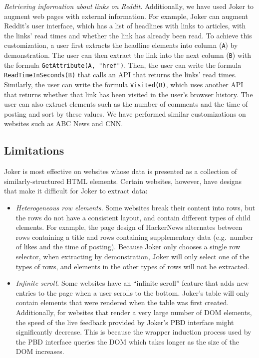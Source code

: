 \documentclass[sigconf,10pt]{acmart}
\providecommand{\tightlist}{%
  \setlength{\itemsep}{0pt}\setlength{\parskip}{0pt}}
\begin{document}
\emph{Retrieving information about links on Reddit.} Additionally, we
have used Joker to augment web pages with external information. For
example, Joker can augment Reddit's user interface, which has a list of
headlines with links to articles, with the links' read times and whether
the link has already been read. To achieve this customization, a user
first extracts the headline elements into column (\texttt{A}) by
demonstration. The user can then extract the link into the next column
(\texttt{B}) with the formula \texttt{GetAttribute(A,\ "href")}. Then,
the user can write the formula \texttt{ReadTimeInSeconds(B)} that calls
an API that returns the links' read times. Similarly, the user can write
the formula \texttt{Visited(B)}, which uses another API that returns
whether that link has been visited in the user's browser history. The
user can also extract elements such as the number of comments and the
time of posting and sort by these values. We have performed similar
customizations on websites such as ABC News and CNN.

\hypertarget{limitations}{%
\subsection{Limitations}\label{limitations}}

Joker is most effective on websites whose data is presented as a
collection of similarly-structured HTML elements. Certain websites,
however, have designs that make it difficult for Joker to extract data:

\begin{itemize}
\tightlist
\item
  \emph{Heterogeneous row elements.} Some websites break their content
  into rows, but the rows do not have a consistent layout, and contain
  different types of child elements. For example, the page design of
  HackerNews alternates between rows containing a title and rows
  containing supplementary data (e.g.~number of likes and the time of
  posting). Because Joker only chooses a single row selector, when
  extracting by demonstration, Joker will only select one of the types
  of rows, and elements in the other types of rows will not be
  extracted.
\item
  \emph{Infinite scroll.} Some websites have an ``infinite scroll''
  feature that adds new entries to the page when a user scrolls to the
  bottom. Joker's table will only contain elements that were rendered
  when the table was first created. Additionally, for websites that
  render a very large number of DOM elements, the speed of the live
  feedback provided by Joker's PBD interface might significantly
  decrease. This is because the wrapper induction process used by the
  PBD interface queries the DOM which takes longer as the size of the
  DOM increases.
\end{itemize}
\end{document}
